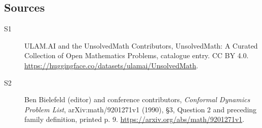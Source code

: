 \documentclass[11pt]{article}
\begin{document}
\subsection{Sources}
\begin{description}
\item[\hypertarget{source:statement:1}{S1}] ULAM.AI and the UnsolvedMath Contributors, UnsolvedMath: A Curated Collection of Open Mathematics Problems, catalogue entry. CC BY 4.0. \url{https://huggingface.co/datasets/ulamai/UnsolvedMath}.
\item[\hypertarget{source:statement:2}{S2}] Ben Bielefeld (editor) and conference contributors, \emph{Conformal Dynamics Problem List}, arXiv:math/9201271v1 (1990), \S3, Question 2 and preceding family definition, printed p. 9. \url{https://arxiv.org/abs/math/9201271v1}.
\end{description}
\label{end:statement}
\end{document}
